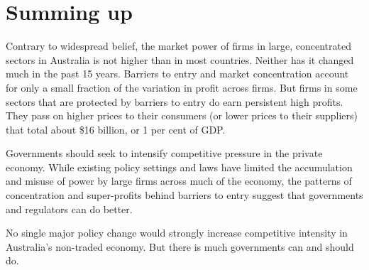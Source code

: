 

\section{Summing up}

Contrary to widespread belief, the market power of firms in large, concentrated sectors in Australia is not higher than in most countries. Neither has it changed much in the past 15 years. Barriers to entry and market concentration account for only a small fraction of the variation in profit across firms. But firms in some sectors that are protected by barriers to entry do earn persistent high profits. They pass on higher prices to their consumers (or lower prices to their suppliers) that total about \$16 billion, or 1 per cent of GDP. 

Governments should seek to intensify competitive pressure in the private economy. While existing policy settings and laws have limited the accumulation and misuse of power by large firms across much of the economy, the patterns of concentration and super-profits behind barriers to entry suggest that governments and regulators can do better.

No single major policy change would strongly increase competitive intensity in Australia's non-traded economy. But there is much governments can and should do.




